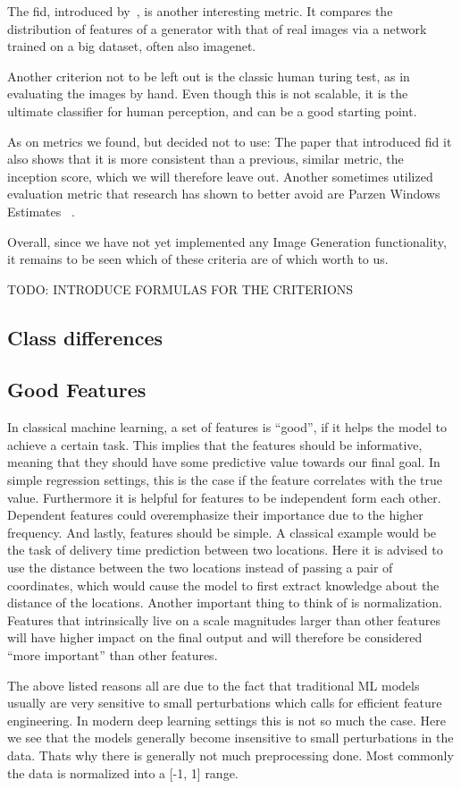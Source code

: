 The \ac{fid}, introduced by~\cite{fid}, is another interesting metric.
It compares the distribution of features of a generator with that of real images via a network trained on a big
dataset, often also imagenet.

Another criterion not to be left out is the classic human turing test, as in evaluating the images by hand.
Even though this is not scalable, it is the ultimate classifier for human perception, and can be a good starting
point.

As on metrics we found, but decided not to use: The paper that introduced \ac{fid} it also shows that it is more
consistent than a previous, similar metric, the inception score, which we will therefore leave out.
Another sometimes utilized evaluation metric that research has shown to better avoid are Parzen Windows Estimates~
\cite{note_on_eval}.

Overall, since we have not yet implemented any Image Generation functionality, it remains to be seen which of these
criteria are of which worth to us.

TODO: INTRODUCE FORMULAS FOR THE CRITERIONS

\subsection{Class differences}

\subsection{Good Features}\label{subsec:good-features}
In classical machine learning, a set of features is ``good'', if it helps the
model to achieve a certain task.
This implies that the features should be
informative, meaning that they should have some predictive value towards our
final goal.
In simple regression settings, this is the case if the feature
correlates with the true value.
Furthermore it is helpful for features to be
independent form each other.
Dependent features could overemphasize their
importance due to the higher frequency.
And lastly, features should be simple.
A classical example would be the task of delivery time prediction between two
locations.
Here it is advised to use the distance between the two locations
instead of passing a pair of coordinates, which would cause the model to first
extract knowledge about the distance of the locations.
Another important thing
to think of is normalization.
Features that intrinsically live on a scale
magnitudes larger than other features will have higher impact on the final
output and will therefore be considered ``more important'' than other features.

The above listed reasons all are due to the fact that traditional ML models
usually are very sensitive to small perturbations which calls for efficient
feature engineering.
In modern deep learning settings this is not so much the
case.
Here we see that the models generally become insensitive to small
perturbations in the data.
Thats why there is generally not much preprocessing done.
Most commonly the data is normalized into a [-1, 1] range.
